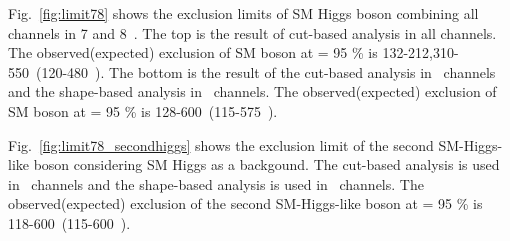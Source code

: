 Fig.~\ref{fig:limit78} shows the exclusion limits of SM Higgs boson combining 
all channels in 7 and 8~\TeV. 
The top is the result of cut-based analysis in all channels.
The observed(expected) exclusion of SM boson at \CLs = 95 \% is 
132-212,310-550~\GeV(120-480~\GeV). 
The bottom is the result of the cut-based analysis in \SF\ channels 
and the shape-based analysis in \DF\ channels.
The observed(expected) exclusion of SM boson at \CLs = 95 \% is 128-600~\GeV(115-575~\GeV). 

Fig.~\ref{fig:limit78_secondhiggs} shows
the exclusion limit of the second SM-Higgs-like boson considering SM Higgs as a backgound.
The cut-based analysis is used in \SF\ channels and the shape-based analysis is used in 
\DF\ channels.
The observed(expected) exclusion of the second SM-Higgs-like boson at \CLs = 95 \% 
is 118-600~\GeV(115-600~\GeV). 

